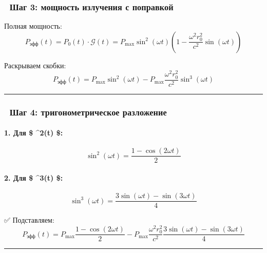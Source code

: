 \documentclass[11pt]{article}
\begin{document}
\subsubsection{🔹 Шаг 3: мощность излучения с
поправкой}\label{ux448ux430ux433-3-ux43cux43eux449ux43dux43eux441ux442ux44c-ux438ux437ux43bux443ux447ux435ux43dux438ux44f-ux441-ux43fux43eux43fux440ux430ux432ux43aux43eux439-1}

Полная мощность:\\
\[
P_{\text{эфф}}(t) = P_0(t) \cdot \mathcal{G}(t) = P_{\text{max}} \sin^2(\omega t) \left( 1 - \frac{\omega^2 r_0^2}{c^2} \sin(\omega t) \right)
\]

Раскрываем скобки:\\
\[
P_{\text{эфф}}(t) = P_{\text{max}} \sin^2(\omega t) - P_{\text{max}} \frac{\omega^2 r_0^2}{c^2} \sin^3(\omega t)
\]

\begin{center}\rule{0.5\linewidth}{\linethickness}\end{center}

\subsubsection{🔹 Шаг 4: тригонометрическое
разложение}\label{ux448ux430ux433-4-ux442ux440ux438ux433ux43eux43dux43eux43cux435ux442ux440ux438ux447ux435ux441ux43aux43eux435-ux440ux430ux437ux43bux43eux436ux435ux43dux438ux435}

\paragraph{\texorpdfstring{1. Для \$ \sin\^{}2(\omega t)
\$:}{1. Для \$ \^{}2(t) \$:}}\label{ux434ux43bux44f-2t}

\[
\sin^2(\omega t) = \frac{1 - \cos(2\omega t)}{2}
\]

\paragraph{\texorpdfstring{2. Для \$ \sin\^{}3(\omega t)
\$:}{2. Для \$ \^{}3(t) \$:}}\label{ux434ux43bux44f-3t}

\[
\sin^3(\omega t) = \frac{3\sin(\omega t) - \sin(3\omega t)}{4}
\]

✅ Подставляем:\\
\[
P_{\text{эфф}}(t) = P_{\text{max}} \frac{1 - \cos(2\omega t)}{2} - P_{\text{max}} \frac{\omega^2 r_0^2}{c^2} \frac{3\sin(\omega t) - \sin(3\omega t)}{4}
\]

\begin{center}\rule{0.5\linewidth}{\linethickness}\end{center}
\end{document}
